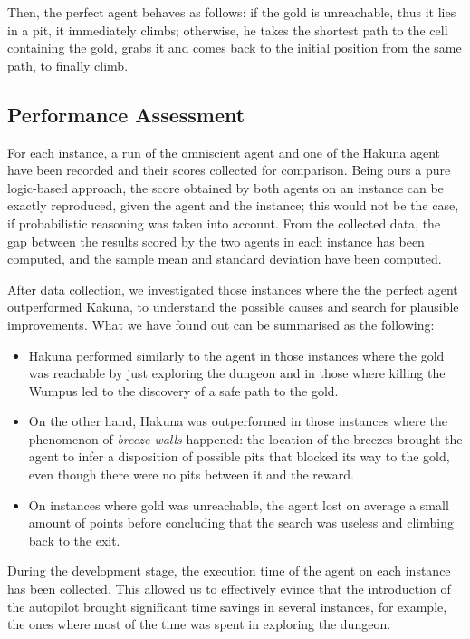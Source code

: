 \documentclass{llncs}
\begin{document}
Then, the perfect agent behaves as follows: if the gold is unreachable, thus it lies in a pit, it immediately climbs; otherwise, he takes the shortest path to the cell containing the gold, grabs it and comes back to the initial position from the same path, to finally climb.

\subsection{Performance Assessment}

For each instance, a run of the omniscient agent and one of the Hakuna agent have been recorded and their scores collected for comparison.
Being ours a pure logic-based approach, the score obtained by both agents on an instance can be exactly reproduced, given the agent and the instance; this would not be the case, if probabilistic reasoning was taken into account.
From the collected data, the gap between the results scored by the two agents in each instance has been computed, and the sample mean and standard deviation have been computed.

After data collection, we investigated those instances where the the perfect agent outperformed Kakuna, to understand the possible causes and search for plausible improvements.
What we have found out can be summarised as the following:
\begin{itemize}
	\item Hakuna performed similarly to the agent in those instances where the gold was reachable by just exploring the dungeon and in those where killing the Wumpus led to the discovery of a safe path to the gold.
	\item On the other hand, Hakuna was outperformed in those instances where the phenomenon of \emph{breeze walls} happened: the location of the breezes brought the agent to infer a disposition of possible pits that blocked its way to the gold, even though there were no pits between it and the reward.
	\item On instances where gold was unreachable, the agent lost on average a small amount of points before concluding that the search was useless and climbing back to the exit.
\end{itemize}

During the development stage, the execution time of the agent on each instance has been collected.
This allowed us to effectively evince that the introduction of the autopilot brought significant time savings in several instances, for example, the ones where most of the time was spent in exploring the dungeon.

\newpage
{}
\appendix
\footnotesize

\begin{multicols}{2}

\end{multicols}


\end{document}
